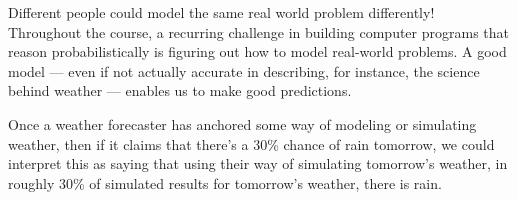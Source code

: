 \documentclass[6008notes.tex]{subfiles}
\begin{document}
Different people could model the same real world problem differently! Throughout the course, a recurring challenge in building computer programs that reason probabilistically is figuring out how to model real-world problems. A good model --- even if not actually accurate in describing, for instance, the science behind weather --- enables us to make good predictions.

Once a weather forecaster has anchored some way of modeling or simulating weather, then if it claims that there's a 30\% chance of rain tomorrow, we could interpret this as saying that using their way of simulating tomorrow's weather, in roughly 30\% of simulated results for tomorrow's weather, there is rain.
\end{document}
